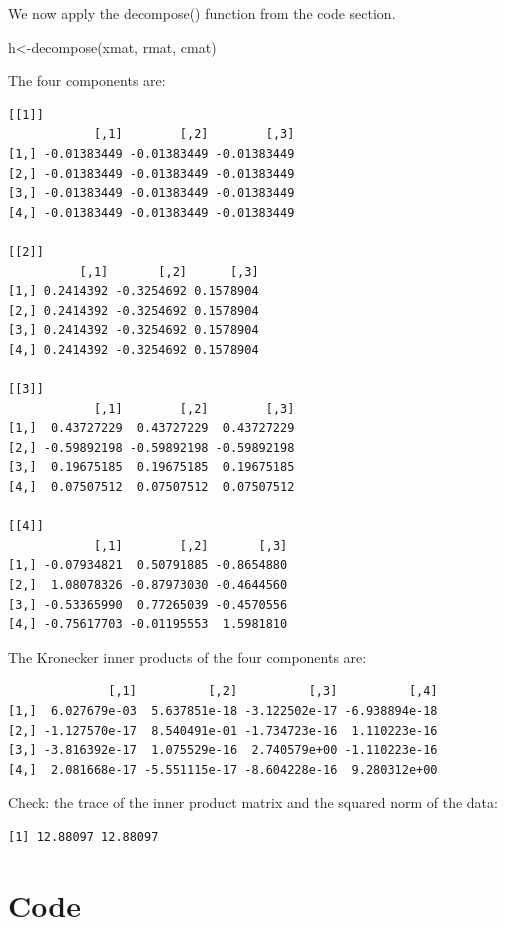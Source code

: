 \documentclass[
  12pt,
  letterpaper,
  DIV=11,
  numbers=noendperiod]{scrartcl}
\newenvironment{Shaded}{\begin{snugshade}}{\end{snugshade}}
\newcommand{\FunctionTok}[1]{\textcolor[rgb]{0.28,0.35,0.67}{#1}}
\newcommand{\NormalTok}[1]{\textcolor[rgb]{0.00,0.23,0.31}{#1}}
\newcommand{\OtherTok}[1]{\textcolor[rgb]{0.00,0.23,0.31}{#1}}
\newcommand{\sectionbreak}{\clearpage}
\begin{document}
We now apply the decompose() function from the code section.

\begin{Shaded}
\begin{Highlighting}[]
\NormalTok{h}\OtherTok{\textless{}{-}}\FunctionTok{decompose}\NormalTok{(xmat, rmat, cmat)}
\end{Highlighting}
\end{Shaded}

The four components are:

\begin{verbatim}
[[1]]
            [,1]        [,2]        [,3]
[1,] -0.01383449 -0.01383449 -0.01383449
[2,] -0.01383449 -0.01383449 -0.01383449
[3,] -0.01383449 -0.01383449 -0.01383449
[4,] -0.01383449 -0.01383449 -0.01383449

[[2]]
          [,1]       [,2]      [,3]
[1,] 0.2414392 -0.3254692 0.1578904
[2,] 0.2414392 -0.3254692 0.1578904
[3,] 0.2414392 -0.3254692 0.1578904
[4,] 0.2414392 -0.3254692 0.1578904

[[3]]
            [,1]        [,2]        [,3]
[1,]  0.43727229  0.43727229  0.43727229
[2,] -0.59892198 -0.59892198 -0.59892198
[3,]  0.19675185  0.19675185  0.19675185
[4,]  0.07507512  0.07507512  0.07507512

[[4]]
            [,1]        [,2]       [,3]
[1,] -0.07934821  0.50791885 -0.8654880
[2,]  1.08078326 -0.87973030 -0.4644560
[3,] -0.53365990  0.77265039 -0.4570556
[4,] -0.75617703 -0.01195553  1.5981810
\end{verbatim}

\sectionbreak

The Kronecker inner products of the four components are:

\begin{verbatim}
              [,1]          [,2]          [,3]          [,4]
[1,]  6.027679e-03  5.637851e-18 -3.122502e-17 -6.938894e-18
[2,] -1.127570e-17  8.540491e-01 -1.734723e-16  1.110223e-16
[3,] -3.816392e-17  1.075529e-16  2.740579e+00 -1.110223e-16
[4,]  2.081668e-17 -5.551115e-17 -8.604228e-16  9.280312e+00
\end{verbatim}

Check: the trace of the inner product matrix and the squared norm of the
data:

\begin{verbatim}
[1] 12.88097 12.88097
\end{verbatim}

\sectionbreak

\section{Code}\label{code}
\end{document}
